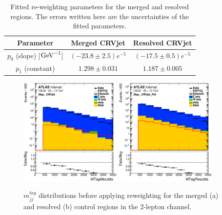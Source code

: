\begin{table}[htbp]
 \footnotesize
\begin{center}
\begin{tabular}{ | c | c | c |}
\hline
Parameter & Merged CRVjet & Resolved CRVjet  \\
\hline
$p_{0}$ (slope) [$\mathrm{GeV}^{-1}$] & $(-23.8 \pm 2.5)e^{-5}$ &  $(-17.5 \pm 0.5)e^{-5}$ \\
 \hline
$p_{1}$ (constant)  & $1.298 \pm 0.031$ & $1.187 \pm 0.005$ \\
\hline
\end{tabular}
\caption{\label{tab:fit} Fitted re-weighting parameters for the merged and resolved regions. The errors written here are the uncertainties of the fitted parameters. }
  \end{center}
\end{table}


\begin{figure}[ht]
    \centering
    \includegraphics[width=0.45\textwidth]{figures/2lep/reweighting/before_reweighting/C_0ptag1pfat0pjet_0ptv_CRVjet_MTagMerJets_Log.eps}
    \includegraphics[width=0.45\textwidth]{figures/2lep/reweighting/before_reweighting/C_0ptag2pjet_0ptv_CRVjet_Fid_MTagResJets_Log.eps}
    \caption{ $m^{tag}_{jj}$ distributions before applying reweighting for the merged (a) and resolved (b) control regions in the 2-lepton channel.}
    \label{fig:2lep_mtag_before_rw}
\end{figure}


